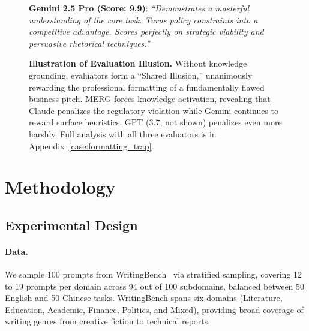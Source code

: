 \documentclass{article}
\begin{document}
\begin{figure}[t]
\begin{tcolorbox}
\begin{tcolorbox}[colback=green!5,colframe=green!50!black,boxrule=0.5pt,arc=2pt,left=2pt,right=2pt,top=2pt,bottom=2pt]
\textbf{Gemini 2.5 Pro (Score: 9.9)}: \textit{``Demonstrates a masterful understanding of the core task. Turns policy constraints into a competitive advantage. Scores perfectly on strategic viability and persuasive rhetorical techniques.''}
\end{tcolorbox}
\end{tcolorbox}
\caption{\textbf{Illustration of Evaluation Illusion.} Without knowledge grounding, evaluators form a ``Shared Illusion,'' unanimously rewarding the professional formatting of a fundamentally flawed business pitch. MERG forces knowledge activation, revealing that Claude penalizes the regulatory violation while Gemini continues to reward surface heuristics. GPT (3.7, not shown) penalizes even more harshly. Full analysis with all three evaluators is in Appendix~\ref{case:formatting_trap}.}
\label{fig:concept_case}
\end{figure}

\section{Methodology}
\label{sec:method}

\subsection{Experimental Design}
\label{sec:setup}

\paragraph{Data.} We sample 100 prompts from WritingBench~\citep{wu2025writingbench} via stratified sampling, covering 12 to 19 prompts per domain across 94 out of 100 subdomains, balanced between 50 English and 50 Chinese tasks. WritingBench spans six domains (Literature, Education, Academic, Finance, Politics, and Mixed), providing broad coverage of writing genres from creative fiction to technical reports.
\end{document}
